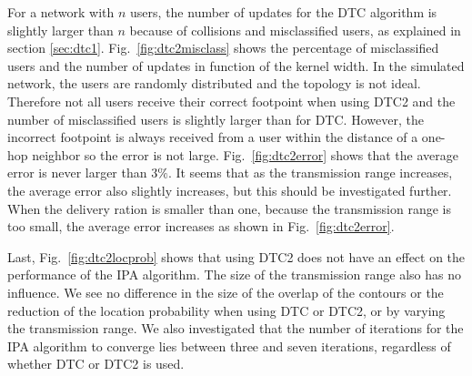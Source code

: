 For a network with $n$ users, the number of updates for the DTC algorithm is slightly larger than $n$ because of collisions and misclassified users, as explained in section \ref{sec:dtc1}. Fig.~\ref{fig:dtc2misclass} shows the percentage of misclassified users and the number of updates in function of the kernel width. In the simulated network, the users are randomly distributed and the topology is not ideal. Therefore not all users receive their correct footpoint when using DTC2 and the number of misclassified users is slightly larger than for DTC. However, the incorrect footpoint is always received from a user within the distance of a one-hop neighbor so the error is not large. Fig.~\ref{fig:dtc2error} shows that the average error is never larger than $3\%$. It seems that as the transmission range increases, the average error also slightly increases, but this should be investigated further. When the delivery ration is smaller than one, because the transmission range is too small, the average error increases as shown in Fig.~\ref{fig:dtc2error}. 

Last, Fig.~\ref{fig:dtc2locprob} shows that using DTC2 does not have an effect on the performance of the IPA algorithm. The size of the transmission range also has no influence. We see no difference in the size of the overlap of the contours or the reduction of the location probability when using DTC or DTC2, or by varying the transmission range. We also investigated that the number of iterations for the IPA algorithm to converge lies between three and seven iterations, regardless of whether DTC or DTC2 is used.


